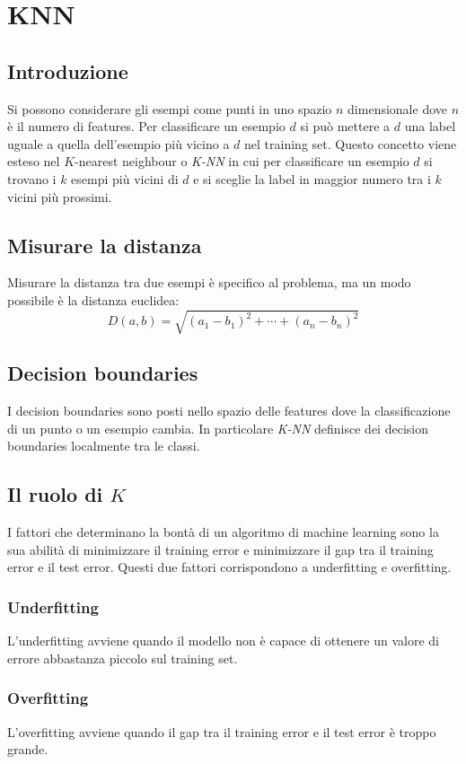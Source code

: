 \chapter{KNN}

\section{Introduzione}
Si possono considerare gli esempi come punti in uno spazio $n$ dimensionale dove $n$ \`e il numero di features.
Per classificare un esempio $d$ si pu\`o mettere a $d$ una label uguale a quella dell'esempio pi\`u vicino a $d$ nel training set.
Questo concetto viene esteso nel $K$-nearest neighbour o \emph{K-NN} in cui per classificare un esempio $d$ si trovano i $k$ esempi pi\`u vicini di $d$ e si sceglie la label in maggior numero tra i $k$ vicini pi\`u prossimi.

\section{Misurare la distanza}
Misurare la distanza tra due esempi \`e specifico al problema, ma un modo possibile \`e la distanza euclidea:
$$D(a,b)=\sqrt{(a_1-b_1)^2+\cdots+(a_n-b_n)^2}$$

\section{Decision boundaries}
I decision boundaries sono posti nello spazio delle features dove la classificazione di un punto o un esempio cambia.
In particolare \emph{K-NN} definisce dei decision boundaries localmente tra le classi.

\section{Il ruolo di $K$}
I fattori che determinano la bont\`a di un algoritmo di machine learning sono la sua abilit\`a di minimizzare il training error e minimizzare il gap tra il training error e il test error.
Questi due fattori corrispondono a underfitting e overfitting.

	\subsection{Underfitting}
	L'underfitting avviene quando il modello non \`e capace di ottenere un valore di errore abbastanza piccolo sul training set.

	\subsection{Overfitting}
	L'overfitting avviene quando il gap tra il training error e il test error \`e troppo grande.

